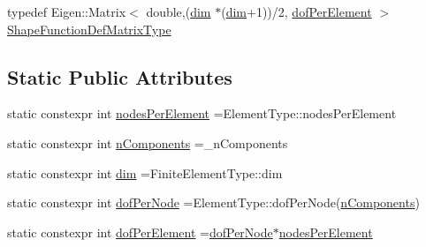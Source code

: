 \begin{DoxyCompactItemize}
\item 
typedef Eigen\+::\+Matrix$<$ double,(\hyperlink{structmodel_1_1_type_traits_3_01_trial_function_3_01__n_components_00_01___finite_element_type_01_4_01_4_a0e102b33c745ebd14f62d11dd9af9f08}{dim} $\ast$(\hyperlink{structmodel_1_1_type_traits_3_01_trial_function_3_01__n_components_00_01___finite_element_type_01_4_01_4_a0e102b33c745ebd14f62d11dd9af9f08}{dim}+1))/2, \hyperlink{structmodel_1_1_type_traits_3_01_trial_function_3_01__n_components_00_01___finite_element_type_01_4_01_4_af917eb0f3f950e58ec3dc6723ace8a3a}{dof\+Per\+Element} $>$ \hyperlink{structmodel_1_1_type_traits_3_01_trial_function_3_01__n_components_00_01___finite_element_type_01_4_01_4_a785ffa59903e476a8bc25da5e84ede33}{Shape\+Function\+Def\+Matrix\+Type}
\end{DoxyCompactItemize}
\subsection*{Static Public Attributes}
\begin{DoxyCompactItemize}
\item 
static constexpr int \hyperlink{structmodel_1_1_type_traits_3_01_trial_function_3_01__n_components_00_01___finite_element_type_01_4_01_4_af61c65452969d01864adf480f0b20b71}{nodes\+Per\+Element} =Element\+Type\+::nodes\+Per\+Element
\item 
static constexpr int \hyperlink{structmodel_1_1_type_traits_3_01_trial_function_3_01__n_components_00_01___finite_element_type_01_4_01_4_a799bac386a22215dacc0f0a61172f07a}{n\+Components} =\+\_\+n\+Components
\item 
static constexpr int \hyperlink{structmodel_1_1_type_traits_3_01_trial_function_3_01__n_components_00_01___finite_element_type_01_4_01_4_a0e102b33c745ebd14f62d11dd9af9f08}{dim} =Finite\+Element\+Type\+::dim
\item 
static constexpr int \hyperlink{structmodel_1_1_type_traits_3_01_trial_function_3_01__n_components_00_01___finite_element_type_01_4_01_4_a7151e05cf54e22aea27ba3f556816760}{dof\+Per\+Node} =Element\+Type\+::dof\+Per\+Node(\hyperlink{structmodel_1_1_type_traits_3_01_trial_function_3_01__n_components_00_01___finite_element_type_01_4_01_4_a799bac386a22215dacc0f0a61172f07a}{n\+Components})
\item 
static constexpr int \hyperlink{structmodel_1_1_type_traits_3_01_trial_function_3_01__n_components_00_01___finite_element_type_01_4_01_4_af917eb0f3f950e58ec3dc6723ace8a3a}{dof\+Per\+Element} =\hyperlink{structmodel_1_1_type_traits_3_01_trial_function_3_01__n_components_00_01___finite_element_type_01_4_01_4_a7151e05cf54e22aea27ba3f556816760}{dof\+Per\+Node}$\ast$\hyperlink{structmodel_1_1_type_traits_3_01_trial_function_3_01__n_components_00_01___finite_element_type_01_4_01_4_af61c65452969d01864adf480f0b20b71}{nodes\+Per\+Element}
\end{DoxyCompactItemize}


